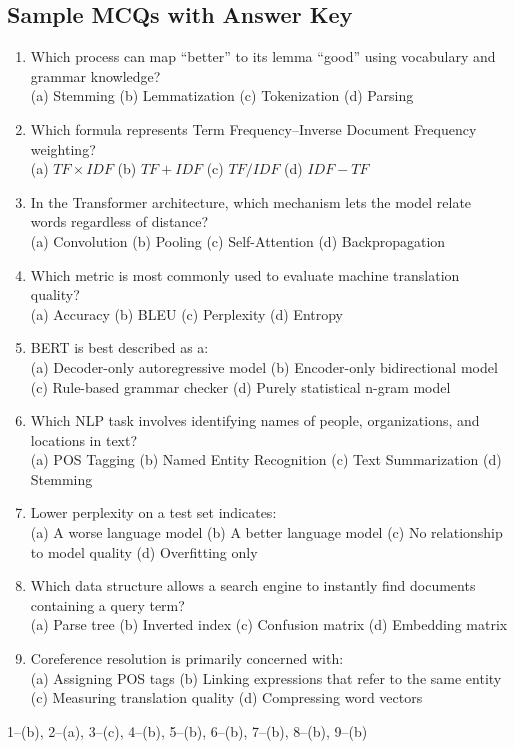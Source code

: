 \documentclass[11pt,a4paper]{article}
\begin{document}
\subsection{Sample MCQs with Answer Key}
\begin{enumerate}[leftmargin=*]
  \item Which process can map ``better'' to its lemma ``good'' using vocabulary and grammar knowledge?\\
  (a) Stemming \quad (b) Lemmatization \quad (c) Tokenization \quad (d) Parsing
  \item Which formula represents Term Frequency--Inverse Document Frequency weighting?\\
  (a) $TF \times IDF$ \quad (b) $TF + IDF$ \quad (c) $TF / IDF$ \quad (d) $IDF - TF$
  \item In the Transformer architecture, which mechanism lets the model relate words regardless of distance?\\
  (a) Convolution \quad (b) Pooling \quad (c) Self-Attention \quad (d) Backpropagation
  \item Which metric is most commonly used to evaluate machine translation quality?\\
  (a) Accuracy \quad (b) BLEU \quad (c) Perplexity \quad (d) Entropy
  \item BERT is best described as a:\\
  (a) Decoder-only autoregressive model \quad (b) Encoder-only bidirectional model \quad (c) Rule-based grammar checker \quad (d) Purely statistical n-gram model
  \item Which NLP task involves identifying names of people, organizations, and locations in text?\\
  (a) POS Tagging \quad (b) Named Entity Recognition \quad (c) Text Summarization \quad (d) Stemming
  \item Lower perplexity on a test set indicates:\\
  (a) A worse language model \quad (b) A better language model \quad (c) No relationship to model quality \quad (d) Overfitting only
  \item Which data structure allows a search engine to instantly find documents containing a query term?\\
  (a) Parse tree \quad (b) Inverted index \quad (c) Confusion matrix \quad (d) Embedding matrix
  \item Coreference resolution is primarily concerned with:\\
  (a) Assigning POS tags \quad (b) Linking expressions that refer to the same entity \quad (c) Measuring translation quality \quad (d) Compressing word vectors
\end{enumerate}
\begin{conceptbox}
1--(b), 2--(a), 3--(c), 4--(b), 5--(b), 6--(b), 7--(b), 8--(b), 9--(b)
\end{conceptbox}
\end{document}
